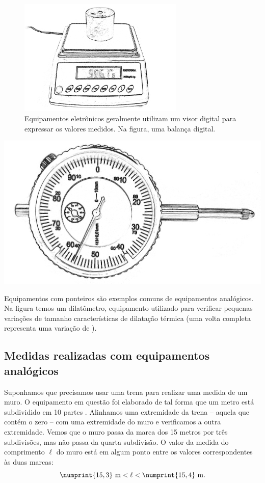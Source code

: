 \begin{figure}
	\centering
	\includegraphics[width=0.7\textwidth]{Ilustrations/Balanca.png}
	\caption{Equipamentos eletrônicos geralmente utilizam um visor digital para expressar os valores medidos. Na figura, uma balança digital.}
\end{figure}
%
\begin{marginfigure}[2cm]
	\includegraphics[width=\textwidth]{Ilustrations/Dilatometro.png}
	\caption{Equipamentos com ponteiros são exemplos comuns de equipamentos analógicos. Na figura temos um dilatômetro, equipamento utilizado para verificar pequenas variações de tamanho características de dilatação térmica (uma volta completa representa uma variação de ).}
\end{marginfigure}
%

\subsection{Medidas realizadas com equipamentos analógicos}
\label{Sec:MedEquipAnalog}

Suponhamos que precisamos usar uma trena para realizar uma medida de um muro. O equipamento em questão foi elaborado de tal forma que um metro está subdividido em 10 partes . Alinhamos uma extremidade da trena -- aquela que contém o zero -- com uma extremidade do muro e verificamos a outra extremidade. Vemos que o muro passa da marca dos 15 metros por três subdivisões, mas não passa da quarta subdivisão. O valor da medida do comprimento $\ell$ do muro está em algum ponto entre os valores correspondentes às duas marcas:
\begin{equation}
     \numprint{15,3}\textrm{~m} < \ell < \numprint{15,4}\textrm{~m}.
\end{equation}

